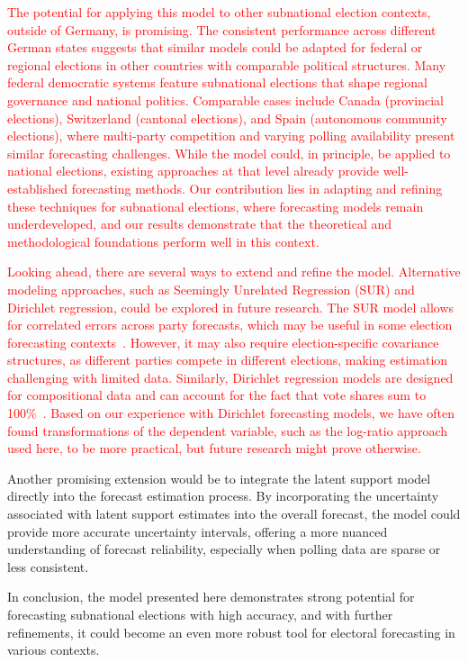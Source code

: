 \documentclass[12pt]{article}
\begin{document}
\begin{doublespacing}
\textcolor{red}{The potential for applying this model to other subnational election contexts, outside of Germany, is promising. The consistent performance across different German states suggests that similar models could be adapted for federal or regional elections in other countries with comparable political structures. Many federal democratic systems feature subnational elections that shape regional governance and national politics. Comparable cases include Canada (provincial elections), Switzerland (cantonal elections), and Spain (autonomous community elections), where multi-party competition and varying polling availability present similar forecasting challenges. While the model could, in principle, be applied to national elections, existing approaches at that level already provide well-established forecasting methods. Our contribution lies in adapting and refining these techniques for subnational elections, where forecasting models remain underdeveloped, and our results demonstrate that the theoretical and methodological foundations perform well in this context.}

\textcolor{red}{Looking ahead, there are several ways to extend and refine the model. Alternative modeling approaches, such as Seemingly Unrelated Regression (SUR) and Dirichlet regression, could be explored in future research. The SUR model allows for correlated errors across party forecasts, which may be useful in some election forecasting contexts~\citep[see e.g.,][]{mongrain202110}. However, it may also require election-specific covariance structures, as different parties compete in different elections, making estimation challenging with limited data. Similarly, Dirichlet regression models are designed for compositional data and can account for the fact that vote shares sum to 100\%~\citep[see e.g.,][]{hanretty2021forecasting, Stoetzer_Neunhoeffer_Gschwend_Munzert_Sternberg_2019}. Based on our experience with Dirichlet forecasting models, we have often found transformations of the dependent variable, such as the log-ratio approach used here, to be more practical, but future research might prove otherwise.}

Another promising extension would be to integrate the latent support model directly into the forecast estimation process. By incorporating the uncertainty associated with latent support estimates into the overall forecast, the model could provide more accurate uncertainty intervals, offering a more nuanced understanding of forecast reliability, especially when polling data are sparse or less consistent. 

In conclusion, the model presented here demonstrates strong potential for forecasting subnational elections with high accuracy, and with further refinements, it could become an even more robust tool for electoral forecasting in various contexts.




\end{doublespacing}
\end{document}
